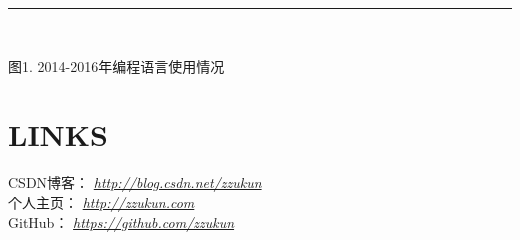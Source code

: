 \documentclass[line, margin]{res}
\newcommand{\xiaowu}{\fontsize{9pt}{15.75pt}\selectfont} %
\begin{document}
\begin{resume}
\rule{13.0cm}{0.05em} \\
\begin{center}
{\xiaowu 图1. 2014-2016年编程语言使用情况}
\end{center}

\vspace {30pt}
\section {LINKS}
{ CSDN博客：} {\sl \url{http://blog.csdn.net/zzukun}}\\
[3pt]
{ 个人主页：} {\sl \url{http://zzukun.com}}\\
[3pt]
{ GitHub： } {\sl \url{https://github.com/zzukun}}\\

\end{resume}
\end{document}
